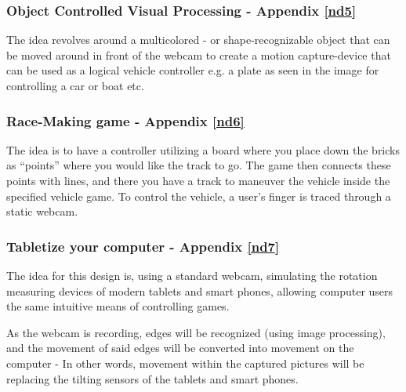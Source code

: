 \subsubsection{Object Controlled Visual Processing - Appendix \ref{nd5}}
The idea revolves around a multicolored - or shape-recognizable object that can be moved around in front of the webcam to create a motion capture-device that can be used as a logical vehicle controller e.g. a plate as seen in the image for controlling a car or boat etc.

\subsubsection{Race-Making game - Appendix \ref{nd6}}
The idea is to have a controller utilizing a board where you place down the bricks as “points” where you would like the track to go. The game then connects these points with lines, and there you have a track to maneuver the vehicle inside the specified vehicle game. To control the vehicle, a user’s finger is traced through a static webcam.

\subsubsection{Tabletize your computer - Appendix \ref{nd7}}
The idea for this design is, using a standard webcam, simulating the rotation measuring devices of modern tablets and smart phones, allowing computer users the same intuitive means of controlling games.

As the webcam is recording, edges will be recognized (using image processing), and the movement of said edges will be converted into movement on the computer - In other words, movement within the captured pictures will be replacing the tilting sensors of the tablets and smart phones.

